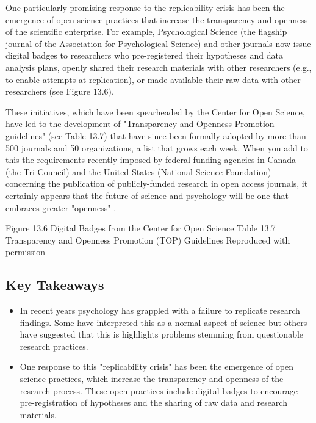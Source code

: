 One particularly promising response to the replicability crisis has been the emergence of open science practices that increase the transparency and openness of the scientific enterprise. For example, Psychological Science (the flagship journal of the Association for Psychological Science) and other journals now issue digital badges to researchers who pre-registered their hypotheses and data analysis plans, openly shared their research materials with other researchers (e.g., to enable attempts at replication), or made available their raw data with other researchers (see Figure 13.6).


These initiatives, which have been spearheaded by the Center for Open Science, have led to the development of "Transparency and Openness Promotion guidelines" (see Table 13.7) that have since been formally adopted by more than 500 journals and 50 organizations, a list that grows each week. When you add to this the requirements recently imposed by federal funding agencies in Canada (the Tri-Council) and the United States (National Science Foundation) concerning the publication of publicly-funded research in open access journals, it certainly appears that the future of science and psychology will be one that embraces greater "openness" \citep{nosek_promoting_2015}.


Figure 13.6 Digital Badges from the Center for Open Science
Table 13.7 Transparency and Openness Promotion (TOP) Guidelines Reproduced with permission


\subsection{Key Takeaways}
\begin{fullwidth}
\begin{itemize}
\item In recent years psychology has grappled with a failure to replicate research findings. Some have interpreted this as a normal aspect of science but others have suggested that this is highlights
problems stemming from questionable research practices.

\item One response to this "replicability crisis" has been the emergence of open science practices,
which increase the transparency and openness of the research process. These open practices include digital badges to encourage pre-registration of hypotheses and the sharing of raw data and research materials.


\end{itemize}
\end{fullwidth}



